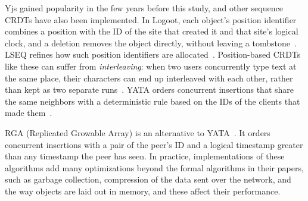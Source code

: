 Yjs gained popularity in the few years before this study, and other sequence CRDTs have also been implemented. In Logoot, each object's position identifier combines a position with the ID of the site that created it and that site's logical clock, and a deletion removes the object directly, without leaving a tombstone~\citep{weiss2009logoot}. LSEQ refines how such position identifiers are allocated~\citep{nedelec2013lseq}. Position-based CRDTs like these can suffer from \emph{interleaving}: when two users concurrently type text at the same place, their characters can end up interleaved with each other, rather than kept as two separate runs~\citep{kleppmann2019interleaving}. YATA orders concurrent insertions that share the same neighbors with a deterministic rule based on the IDs of the clients that made them~\citep{Nicolaescu2016yjs}.

RGA (Replicated Growable Array) is an alternative to YATA~\citep{roh2011replicatedrga}. It orders concurrent insertions with a pair of the peer's ID and a logical timestamp greater than any timestamp the peer has seen. In practice, implementations of these algorithms add many optimizations beyond the formal algorithms in their papers, such as garbage collection, compression of the data sent over the network, and the way objects are laid out in memory, and these affect their performance.

